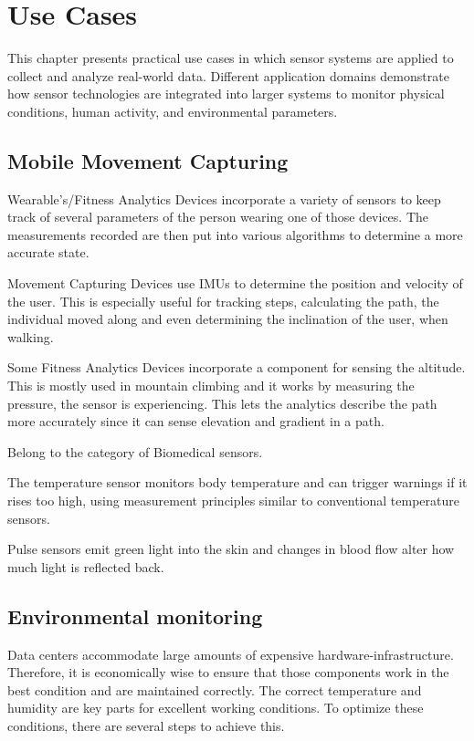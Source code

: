 \chapter{Use Cases}
This chapter presents practical use cases in which sensor systems are applied to collect and analyze real-world data. Different application domains demonstrate how sensor technologies are integrated into larger systems to monitor physical conditions, human activity, and environmental parameters.

\section{Mobile Movement Capturing}
Wearable's/Fitness Analytics Devices incorporate a variety of sensors to keep track of several parameters of the person wearing one of those devices. The measurements recorded are then put into various algorithms to determine a more accurate state.

Movement Capturing Devices use IMUs to determine the position and velocity of the user. This is especially useful for tracking steps, calculating the path, the individual moved along and even determining the inclination of the user, when walking.

\noindent\cite{LRWeb:47}

Some Fitness Analytics Devices incorporate a component for sensing the altitude. This is mostly used in mountain climbing and it works by measuring the pressure, the sensor is experiencing. This lets the analytics describe the path more accurately since it can sense elevation and gradient in a path. 

\noindent\cite{LRWeb:47}

Belong to the category of Biomedical sensors.

The temperature sensor monitors body temperature and can trigger warnings if it rises too high, using measurement principles similar to conventional temperature sensors.

\noindent\cite{LRWeb:47}

Pulse sensors emit green light into the skin and changes in blood flow alter how much light is reflected back.

\noindent\cite{LRWeb:48}

\section{Environmental monitoring}
Data centers accommodate large amounts of expensive hardware-infrastructure. Therefore, it is economically wise to ensure that those components work in the best condition and are maintained correctly. The correct temperature and humidity are key parts for excellent working conditions. To optimize these conditions, there are several steps to achieve this.

